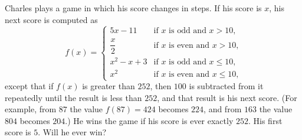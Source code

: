 Charles plays a game in which his score changes in steps. If his score is $x$, his next score is computed as
\[f(x)=\begin{cases}5x-11&\text{if $x$ is odd and $x>10$,}\\[2pt] \dfrac{x}{2}&\text{if $x$ is even and $x>10$,}\\[2pt] x^2-x+3&\text{if $x$ is odd and $x\le10$,}\\[2pt] x^2&\text{if $x$ is even and $x\le10$,}\end{cases}\]
except that if $f(x)$ is greater than $252$, then $100$ is subtracted from it repeatedly until the result is less than $252$, and that result is his next score. (For example, from $87$ the value $f(87)=424$ becomes $224$, and from $163$ the value $804$ becomes $204$.) He wins the game if his score is ever exactly $252$. His first score is $5$. Will he ever win?
